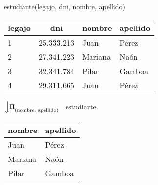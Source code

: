 \documentclass[preview]{standalone}
\begin{document}
\begin{center}
estudiante(\underline{legajo}, dni, nombre, apellido)\\
\vspace{.35cm}
\begin{tabular}{| l | c | l | l | }\hline			
	legajo & dni & nombre & apellido \\\hline			
	1 & 25.333.213 & Juan & P\'erez \\
	2 & 27.341.223 & Mariana & Na\'on\\
	3 & 32.341.784 & Pilar & Gamboa \\
	4 & 29.311.665 & Juan & P\'erez \\\hline	
\end{tabular}
\vspace{.35cm}

$\Big\Downarrow {\Large\Pi_{\textsubscript{(nombre, apellido)}}}$ \ estudiante 
\vspace{.35cm}

\begin{tabular}{| l | l | }\hline			
	nombre & apellido \\\hline			
	Juan & P\'erez \\
	Mariana & Na\'on\\
	Pilar & Gamboa \\\hline	
\end{tabular}
\end{center}
\end{document}
